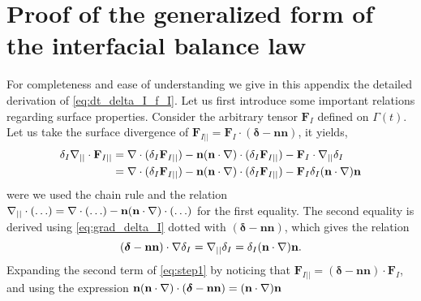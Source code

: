 \section{Proof of the generalized form of the interfacial balance law}
\label{ap:interface_proof}
For completeness and ease of understanding we give in this appendix the detailed derivation of \ref{eq:dt_delta_I_f_I}. 
Let us first introduce some important relations regarding surface properties. 
Consider the arbitrary tensor $ \textbf{F}_{I}$ defined on $\Gamma(t)$.
Let us take the surface divergence of $\textbf{F}_{I||} = \textbf{F}_I \cdot (\bm\delta -\textbf{nn})$, it yields,
\begin{align}
    \delta_I \mathbf{\nabla}_{||}\cdot \textbf{F}_{I||}
    &= 
    \mathbf{\nabla}\cdot (\delta_I \textbf{F}_{I||})
    - \textbf{n}(\textbf{n}\cdot\mathbf{\nabla})\cdot (\delta_I \textbf{F}_{I||})
    - \textbf{F}_{I}\cdot\mathbf{\nabla}_{||}\delta_I \nonumber\\
    &= 
    \mathbf{\nabla}\cdot (\delta_I \textbf{F}_{I||})
    - \textbf{n}(\textbf{n}\cdot\mathbf{\nabla})\cdot (\delta_I \textbf{F}_{I||})
    - \textbf{F}_{I} \delta_I (\textbf{n}\cdot\mathbf{\nabla})\textbf{n}
    \label{eq:step1}
\end{align}
were we used the chain rule and the relation $\mathbf{\nabla}_{||}\cdot(\ldots) = \mathbf{\nabla}\cdot(\ldots) - \textbf{n}(\textbf{n}\cdot \mathbf{\nabla})\cdot(\ldots)$ for the first equality. 
The second equality is derived using \ref{eq:grad_delta_I} dotted with $(\bm\delta -\textbf{nn})$, which gives the relation 
\begin{equation*}
    (\bm\delta - \textbf{nn}) \cdot \mathbf{\nabla}\delta_I
    = \mathbf{\nabla}_{||} \delta_I
    = 
    \delta_I (\textbf{n}\cdot \mathbf{\nabla})\textbf{n}.
\end{equation*}
Expanding the second term of \ref{eq:step1} by noticing that $\textbf{F}_{I||} = (\bm\delta - \textbf{nn})\cdot \textbf{F}_I$, and using the expression $\textbf{n}(\textbf{n}\cdot\mathbf{\nabla})\cdot (\bm\delta - \textbf{nn}) =  (\textbf{n}\cdot\mathbf{\nabla})\textbf{n}$
